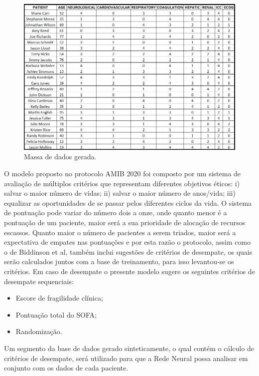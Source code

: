 \documentclass[12pt]{article}
\begin{document}
\begin{figure}[!htb]
    \centering
    \includegraphics[scale=0.6]{img/massa de dados gerada.png}
    \centering
    \caption{Massa de dados gerada.}
    \label{subexpressao2}
\end{figure}

O modelo proposto no protocolo AMIB 2020 foi composto por um sistema de avaliação de múltiplos critérios que representam diferentes objetivos éticos: i) salvar o maior número de vidas; ii) salvar o maior número de anos/vida; iii) equalizar as oportunidades de se passar pelos diferentes ciclos da vida. O sistema de pontuação pode variar do número dois a onze, onde quanto menor é a pontuação de um paciente, maior será a sua prioridade de alocação de recursos escassos. Quanto maior o número de pacientes a serem triados, maior será a expectativa de empates nas pontuações e por esta razão o protocolo, assim como o de Biddinson et al, também inclui sugestões de critérios de desempate, os quais serão calculados juntos com a base de treinamento, para isso levantou-se os critérios. Em caso de desempate o presente modelo sugere os seguintes critérios de desempate sequenciais:
\begin{itemize}
  \item Escore de fragilidade clínica;
  \item Pontuação total do SOFA;
  \item Randomização.
\end{itemize}

Um segmento da base de dados gerado sinteticamente, o qual contém o cálculo de critérios de desempate, será utilizado para que a Rede Neural possa analisar em conjunto com os dados de cada paciente.
\end{document}
